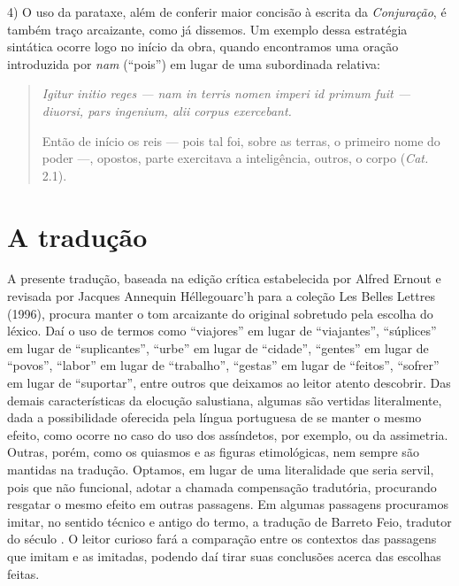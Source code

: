 4) O uso da parataxe, além de conferir maior concisão à escrita da \emph{Conjuração},
é também traço arcaizante, como já dissemos. Um exemplo dessa estratégia
sintática ocorre logo no início da obra, quando encontramos uma oração
introduzida por \emph{nam} (“pois”) em lugar de uma subordinada relativa:
\begin{quote} \emph{Igitur initio reges --- nam in terris nomen imperi id primum
  fuit --- diuorsi, pars ingenium, alii corpus exercebant.}

Então de início os reis --- pois tal foi, sobre as terras, o primeiro nome do
poder ---, opostos, parte exercitava a inteligência, outros, o corpo (\emph{Cat.} 2.1).
\end{quote}



\section{A tradução}

 A presente tradução, baseada na edição crítica estabelecida por Alfred Ernout e revisada por Jacques Annequin Héllegouarc'h para a coleção
 Les Belles Lettres (1996), procura manter o tom arcaizante do original
 sobretudo pela escolha do léxico. Daí o uso de termos como “viajores” em lugar
 de “viajantes”, “súplices” em lugar de “suplicantes”, “urbe” em lugar de
 “cidade”, “gentes” em lugar de “povos”, “labor” em lugar de “trabalho”,
 “gestas” em lugar de “feitos”, “sofrer” em lugar de “suportar”, entre outros
 que deixamos ao leitor atento descobrir.  Das demais características da
 elocução salustiana, algumas são vertidas literalmente, dada a possibilidade
 oferecida pela língua portuguesa de se manter o mesmo efeito, como ocorre no
 caso do uso dos assíndetos, por exemplo, ou da assimetria. Outras, porém, como os quiasmos e as figuras
 etimológicas, nem sempre são mantidas na tradução. Optamos, em lugar de uma
 literalidade que seria servil, pois que não funcional, adotar a chamada
 compensação tradutória, procurando resgatar o mesmo efeito em outras
 passagens.  Em algumas passagens procuramos imitar, no sentido técnico
 e antigo do termo, a tradução de Barreto Feio, tradutor do século . O leitor
 curioso fará a comparação entre os contextos das passagens que imitam e as
 imitadas, podendo daí tirar suas conclusões acerca das escolhas feitas. 

